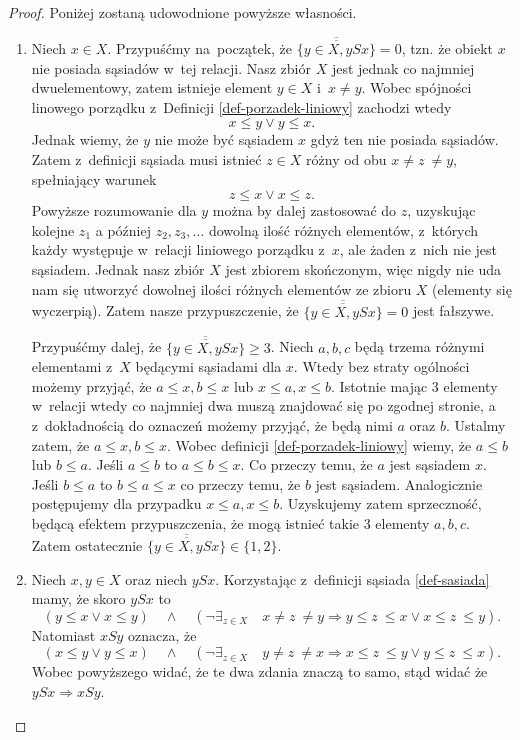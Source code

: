 \documentclass[12pt,a4paper]{report}
\newcommand{\licznosc}[1]{\overline{\overline{#1}}}
\begin{document}
\begin{proof}
Poniżej zostaną udowodnione powyższe własności.
\begin{enumerate}
\item Niech $x \in X$. Przypuśćmy na~początek, że $\licznosc{\{y \in X, ySx\}} = 0$, tzn. że obiekt $x$ nie posiada sąsiadów w~tej relacji. Nasz zbiór $X$ jest jednak co najmniej dwuelementowy, zatem istnieje element $y \in X$ i~$ x \neq y$. Wobec spójności linowego porządku z~Definicji \ref{def-porzadek-liniowy} zachodzi wtedy
$$ x \leq y \lor y \leq x.$$
Jednak wiemy, że $y$ nie może być sąsiadem $x$ gdyż ten nie posiada sąsiadów. Zatem z~definicji sąsiada musi istnieć $z \in X$ różny od obu $x \neq z~\neq y$, spełniający warunek
$$
z \leq x \lor x \leq z.
$$
Powyższe rozumowanie dla $y$ można by dalej zastosować do $z$, uzyskując kolejne $z_1$ a później $z_2,z_3, \ldots$ dowolną ilość różnych elementów, z~których każdy występuje w~relacji liniowego porządku z~$x$, ale żaden z~nich nie jest sąsiadem. Jednak nasz zbiór $X$ jest zbiorem skończonym, więc nigdy nie uda nam się utworzyć dowolnej ilości różnych elementów ze zbioru $X$ (elementy się wyczerpią). Zatem nasze przypuszczenie, że $\licznosc{\{y \in X, ySx\}} = 0$ jest fałszywe.

Przypuśćmy dalej, że $\licznosc{\{y \in X, ySx\}} \geq 3$. Niech $a,b,c$ będą trzema różnymi elementami z~$X$ będącymi sąsiadami dla $x$. Wtedy bez straty ogólności możemy przyjąć, że $a \leq x, b \leq x$ lub $x \leq a, x \leq b$. Istotnie mając 3 elementy w~relacji wtedy co najmniej dwa muszą znajdować się po zgodnej stronie, a z~dokładnością do oznaczeń możemy przyjąć, że będą nimi $a$ oraz $b$. Ustalmy zatem, że $a \leq x, b \leq x$. Wobec definicji \ref{def-porzadek-liniowy} wiemy, że $a \leq b$ lub $b \leq a$. Jeśli $a \leq b$ to $a \leq b \leq x$. Co przeczy temu, że $a$ jest sąsiadem $x$. Jeśli $b \leq a$ to $b \leq a \leq x$ co przeczy temu, że $b$ jest sąsiadem. Analogicznie postępujemy dla przypadku $x \leq a, x \leq b$. Uzyskujemy zatem sprzeczność, będącą efektem przypuszczenia, że mogą istnieć takie 3 elementy $a,b,c$. Zatem ostatecznie $\licznosc{\{y \in X, ySx\}} \in \{ 1,2 \}$.

\item Niech $x,y \in X$ oraz niech $ySx$. Korzystając z~definicji sąsiada \ref{def-sasiada} mamy, że skoro $ySx$ to  $$\left(y \leq x \lor x\leq y \right)\quad \land \quad  \left(\lnot \exists_{z \in X}  \quad x\neq z~\neq y \Rightarrow   y \leq z~\leq x \lor x \leq z~\leq y \right).$$ 
Natomiast $xSy$ oznacza, że 
$$\left(x \leq y \lor y\leq x \right)\quad \land \quad  \left(\lnot \exists_{z \in X}  \quad y\neq z~\neq x \Rightarrow   x \leq z~\leq y \lor y \leq z~\leq x \right).$$ 
Wobec powyższego widać, że te dwa zdania znaczą to samo, stąd widać że  $ySx \Rightarrow xSy$. %


\end{enumerate}
\end{proof}
\end{document}
